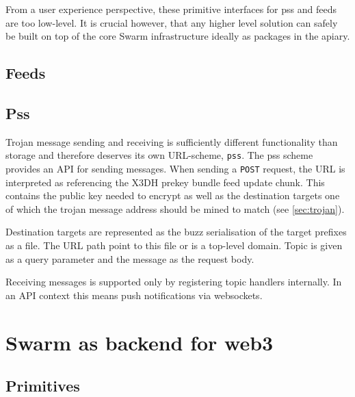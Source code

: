 From a user experience perspective, these  primitive interfaces for pss and feeds are too low-level. It is  crucial however, that any higher level solution can safely be built on top of the core Swarm infrastructure ideally as packages in the apiary.

\subsection{Feeds \statusred}\label{sec:feeds-ux}


\subsection{Pss \statusred}\label{sec:pss-ux}

Trojan message sending and receiving is sufficiently different functionality than storage and therefore deserves its  own URL-scheme, \lstinline{pss}. The pss scheme provides an API for sending messages. When  sending a \lstinline{POST} request, the URL is interpreted  as referencing the X3DH prekey bundle feed update chunk. This contains the public key needed to encrypt as well as the destination targets    one  of which the trojan message address should be mined to  match (see \ref{sec:trojan}). 

Destination targets are represented as the buzz serialisation of the target   prefixes as a file. The URL path point to this file or is a top-level domain. Topic is given as a query parameter and the message as the request body.

Receiving messages is supported only by registering topic handlers internally. In an API context this means push notifications via websockets.



\section{Swarm as backend for web3 \statusred}\label{sec:buzz-apiary}

\subsection{Primitives \statusred}\label{sec:primitives}


